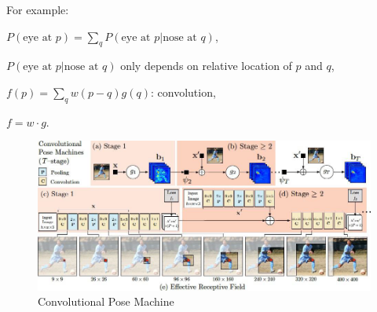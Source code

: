 For example:
\begin{myitem}
    \item $P(\text{eye at } p) = \sum_q P(\text{eye at } p | \text{nose at } q)$,
    \item $P(\text{eye at } p | \text{nose at } q)$ only depends on relative location of $p$ and $q$,
    \item $f(p) = \sum_q w(p-q)g(q)$: convolution,
    \item $f = w \cdot g$.
\end{myitem}

\begin{figure}[h!]
    \centering
    \includegraphics[width=0.7\linewidth]{images/convolutional-pose-machine}
    \caption[Convolutional Pose Machine]{Convolutional Pose Machine}
    \label{fig:pe-convolutional-pose-machine}
\end{figure}

